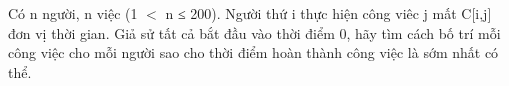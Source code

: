Có n người, n việc (1 $<$ n ≤ 200). Người thứ i thực hiện công viêc j mất C[i,j] đơn vị thời gian. Giả sử tất cả bắt đầu vào thời điểm 0, hãy tìm cách bố trí mỗi công việc cho mỗi người sao cho thời điểm hoàn thành công việc là sớm nhất có thể.

\